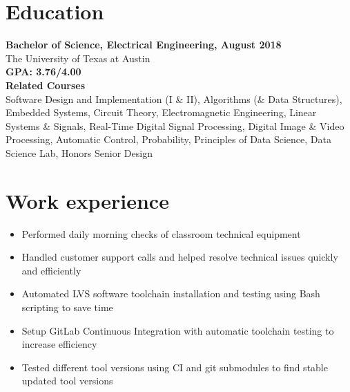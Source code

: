 \documentclass{resume}
\begin{document}
\resumetitle

\section{Education}
\begin{center}
    \textbf{Bachelor of Science, Electrical Engineering, August 2018} \\
    The University of Texas at Austin \\
    \textbf{GPA: 3.76/4.00} \\
    \vspace{1em}
    \textbf{Related Courses} \\
    Software Design and Implementation (I \& II), Algorithms (\& Data Structures), Embedded Systems, Circuit Theory, Electromagnetic Engineering, Linear Systems \& Signals, Real-Time Digital Signal Processing, Digital Image \& Video Processing, Automatic Control, Probability, Principles of Data Science, Data Science Lab, Honors Senior Design
\end{center}

\section{Work experience}
\begin{itemize}
    \item Performed daily morning checks of classroom technical equipment
    \item Handled customer support calls and helped resolve technical issues quickly and efficiently
\end{itemize}
\begin{itemize}
    \item Automated LVS software toolchain installation and testing using Bash scripting to save time
    \item Setup GitLab Continuous Integration with automatic toolchain testing to increase efficiency
    \item Tested different tool versions using CI and git submodules to find stable updated tool versions
\end{itemize} 
\end{document}
